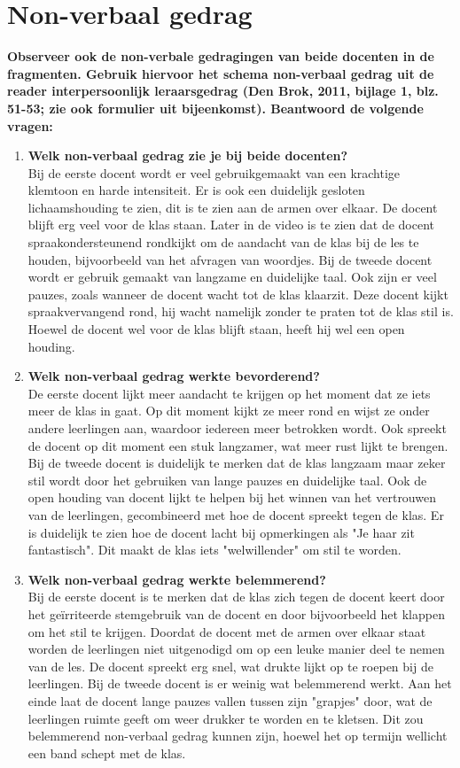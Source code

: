 \documentclass{article}
\begin{document}
    \section{Non-verbaal gedrag}
    \textbf{Observeer ook de non-verbale gedragingen van beide docenten in de fragmenten. Gebruik hiervoor het schema non-verbaal gedrag uit de reader interpersoonlijk leraarsgedrag (Den Brok, 2011, bijlage 1, blz. 51-53; zie ook formulier uit bijeenkomst). Beantwoord de volgende vragen:}
    \begin{enumerate}[label=(\alph*)]
        \item \textbf{Welk non-verbaal gedrag zie je bij beide docenten?}\\ 
        Bij de eerste docent wordt er veel gebruikgemaakt van een krachtige klemtoon en harde intensiteit. Er is ook een duidelijk gesloten lichaamshouding te zien, dit is te zien aan de armen over elkaar. De docent blijft erg veel voor de klas staan. Later in de video is te zien dat de docent spraakondersteunend rondkijkt om de aandacht van de klas bij de les te houden, bijvoorbeeld van het afvragen van woordjes.
        Bij de tweede docent wordt er gebruik gemaakt van langzame en duidelijke taal. Ook zijn er veel pauzes, zoals wanneer de docent wacht tot de klas klaarzit. Deze docent kijkt spraakvervangend rond, hij wacht namelijk zonder te praten tot de klas stil is. Hoewel de docent wel voor de klas blijft staan, heeft hij wel een open houding.
        \item \textbf{Welk non-verbaal gedrag werkte bevorderend?} \\
        De eerste docent lijkt meer aandacht te krijgen op het moment dat ze iets meer de klas in gaat. Op dit moment kijkt ze meer rond en wijst ze onder andere leerlingen aan, waardoor iedereen meer betrokken wordt. Ook spreekt de docent op dit moment een stuk langzamer, wat meer rust lijkt te brengen.
        Bij de tweede docent is duidelijk te merken dat de klas langzaam maar zeker stil wordt door het gebruiken van lange pauzes en duidelijke taal. Ook de open houding van docent lijkt te helpen bij het winnen van het vertrouwen van de leerlingen, gecombineerd met hoe de docent spreekt tegen de klas. Er is duidelijk te zien hoe de docent lacht bij opmerkingen als "Je haar zit fantastisch". Dit maakt de klas iets "welwillender" om stil te worden.
        \item \textbf{Welk non-verbaal gedrag werkte belemmerend?} \\
        Bij de eerste docent is te merken dat de klas zich tegen de docent keert door het geïrriteerde stemgebruik van de docent en door bijvoorbeeld het klappen om het stil te krijgen. Doordat de docent met de armen over elkaar staat worden de leerlingen niet uitgenodigd om op een leuke manier deel te nemen van de les. De docent spreekt erg snel, wat drukte lijkt op te roepen bij de leerlingen.
        Bij de tweede docent is er weinig wat belemmerend werkt. Aan het einde laat de docent lange pauzes vallen tussen zijn "grapjes" door, wat de leerlingen ruimte geeft om weer drukker te worden en te kletsen. Dit zou belemmerend non-verbaal gedrag kunnen zijn, hoewel het op termijn wellicht een band schept met de klas. 
    \end{enumerate}
\end{document}
